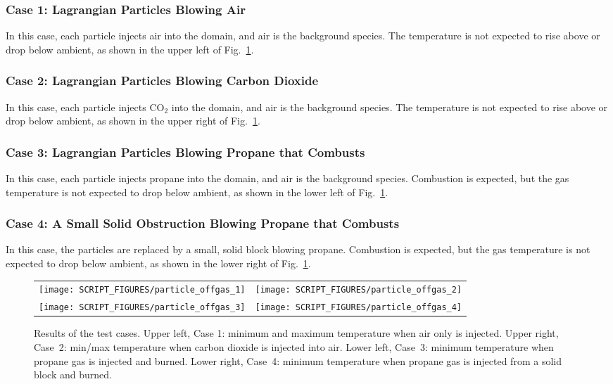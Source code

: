 \documentclass[11pt]{book}
\begin{document}
\subsubsection{Case 1: Lagrangian Particles Blowing Air}

In this case, each particle injects air into the domain, and air is the background species. The temperature is not expected to rise above or drop below ambient, as shown in the upper left of Fig.~\ref{particle_offgas_plots}.

\subsubsection{Case 2: Lagrangian Particles Blowing Carbon Dioxide}

In this case, each particle injects CO$_2$ into the domain, and air is the background species. The temperature is not expected to rise above or drop below ambient, as shown in the upper right of Fig.~\ref{particle_offgas_plots}.

\subsubsection{Case 3: Lagrangian Particles Blowing Propane that Combusts}

In this case, each particle injects propane into the domain, and air is the background species. Combustion is expected, but the gas temperature is not expected to drop below ambient, as shown in the lower left of Fig.~\ref{particle_offgas_plots}.

\subsubsection{Case 4: A Small Solid Obstruction Blowing Propane that Combusts}

In this case, the particles are replaced by a small, solid block blowing propane. Combustion is expected, but the gas temperature is not expected to drop below ambient, as shown in the lower right of Fig.~\ref{particle_offgas_plots}.

\begin{figure}[!ht]
\begin{tabular*}{\textwidth}{lr}
\texttt{[image: SCRIPT\_FIGURES/particle\_offgas\_1]} &
\texttt{[image: SCRIPT\_FIGURES/particle\_offgas\_2]} \\
\texttt{[image: SCRIPT\_FIGURES/particle\_offgas\_3]} &
\texttt{[image: SCRIPT\_FIGURES/particle\_offgas\_4]}
\end{tabular*}
\caption[The  test cases]{Results of the  test cases. Upper left, Case 1: minimum and maximum temperature when air only is injected. Upper right, Case~2: min/max temperature when carbon dioxide is injected into air. Lower left, Case~3: minimum temperature when propane gas is injected and burned. Lower right, Case~4: minimum temperature when propane gas is injected from a solid block and burned. }
\label{particle_offgas_plots}
\end{figure}
\end{document}
